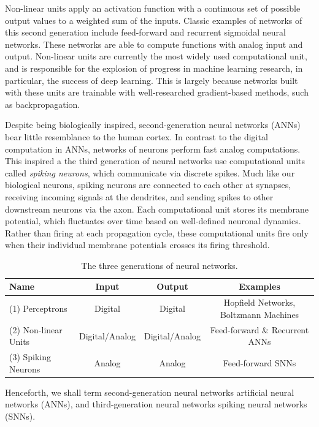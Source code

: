 \documentclass[fyp]{socreport}
\begin{document}
Non-linear units apply an activation function with a continuous set of possible
output values to a weighted sum of the inputs. Classic examples of networks of
this second generation include feed-forward and recurrent sigmoidal neural
networks. These networks are able to compute functions with analog input and
output. Non-linear units are currently the most widely used computational unit,
and is responsible for the explosion of progress in machine learning research,
in particular, the success of deep learning. This is largely because networks
built with these units are trainable with well-researched gradient-based
methods, such as backpropagation.

Despite being biologically inspired, second-generation neural networks (ANNs)
bear little resemblance to the human cortex. In contrast to the digital
computation in ANNs, networks of neurons perform fast analog computations. This
inspired a the third generation of neural networks use computational units
called \emph{spiking neurons}, which communicate via discrete spikes. Much like
our biological neurons, spiking neurons are connected to each other at synapses,
receiving incoming signals at the dendrites, and sending spikes to other
downstream neurons via the axon. Each computational unit stores its membrane
potential, which fluctuates over time based on well-defined neuronal dynamics.
Rather than firing at each propagation cycle, these computational units fire
only when their individual membrane potentials crosses its firing threshold.

\begin{table}
  \centering
  \small
  \begin{tabular}{ l|ccc }
    \hline
    \hline
    \textbf{Name} & \textbf{Input} & \textbf{Output} & \textbf{Examples} \\
    \hline
    (1) Perceptrons & Digital & Digital & Hopfield Networks, Boltzmann Machines \\
    (2) Non-linear Units & Digital/Analog & Digital/Analog & Feed-forward \& Recurrent ANNs \\
    (3) Spiking Neurons & Analog & Analog & Feed-forward SNNs \\
    \hline
    \hline
  \end{tabular}
  \normalsize
  \caption{\label{tab:nn_generations} The three generations of neural networks. }
\end{table}

Henceforth, we shall term second-generation neural networks artificial neural
networks (ANNs), and third-generation neural networks spiking neural networks
(SNNs).
\end{document}
